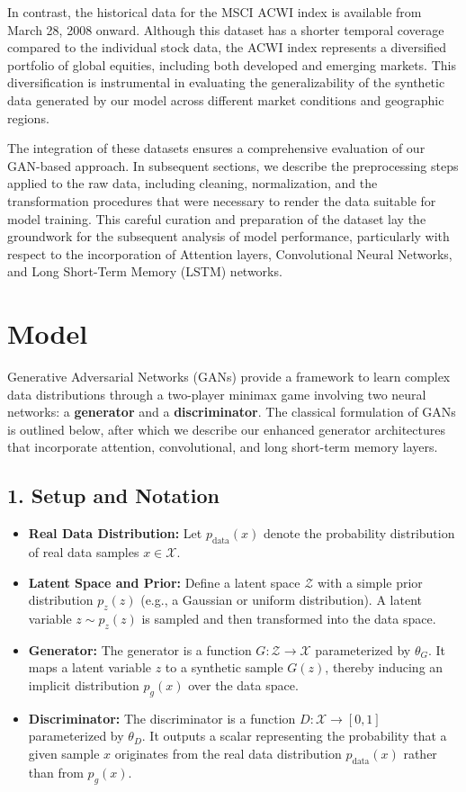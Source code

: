 \documentclass{article}
\begin{document}
In contrast, the historical data for the MSCI ACWI index is available from March 28, 2008 onward. Although this dataset has a shorter temporal coverage compared to the individual stock data, the ACWI index represents a diversified portfolio of global equities, including both developed and emerging markets. This diversification is instrumental in evaluating the generalizability of the synthetic data generated by our model across different market conditions and geographic regions.

The integration of these datasets ensures a comprehensive evaluation of our GAN-based approach. In subsequent sections, we describe the preprocessing steps applied to the raw data, including cleaning, normalization, and the transformation procedures that were necessary to render the data suitable for model training. This careful curation and preparation of the dataset lay the groundwork for the subsequent analysis of model performance, particularly with respect to the incorporation of Attention layers, Convolutional Neural Networks, and Long Short-Term Memory (LSTM) networks.

\section{Model}

Generative Adversarial Networks (GANs) provide a framework to learn complex data distributions through a two-player minimax game involving two neural networks: a \textbf{generator} and a \textbf{discriminator}. The classical formulation of GANs is outlined below, after which we describe our enhanced generator architectures that incorporate attention, convolutional, and long short-term memory layers.

\subsection*{1. Setup and Notation}

\begin{itemize}
    \item \textbf{Real Data Distribution:} Let $p_{\text{data}}(x)$ denote the probability distribution of real data samples $x \in \mathcal{X}$.
    \item \textbf{Latent Space and Prior:} Define a latent space $\mathcal{Z}$ with a simple prior distribution $p_z(z)$ (e.g., a Gaussian or uniform distribution). A latent variable $z \sim p_z(z)$ is sampled and then transformed into the data space.
    \item \textbf{Generator:} The generator is a function $G: \mathcal{Z} \to \mathcal{X}$ parameterized by $\theta_G$. It maps a latent variable $z$ to a synthetic sample $G(z)$, thereby inducing an implicit distribution $p_g(x)$ over the data space.
    \item \textbf{Discriminator:} The discriminator is a function $D: \mathcal{X} \to [0,1]$ parameterized by $\theta_D$. It outputs a scalar representing the probability that a given sample $x$ originates from the real data distribution $p_{\text{data}}(x)$ rather than from $p_g(x)$.
\end{itemize}
\end{document}
